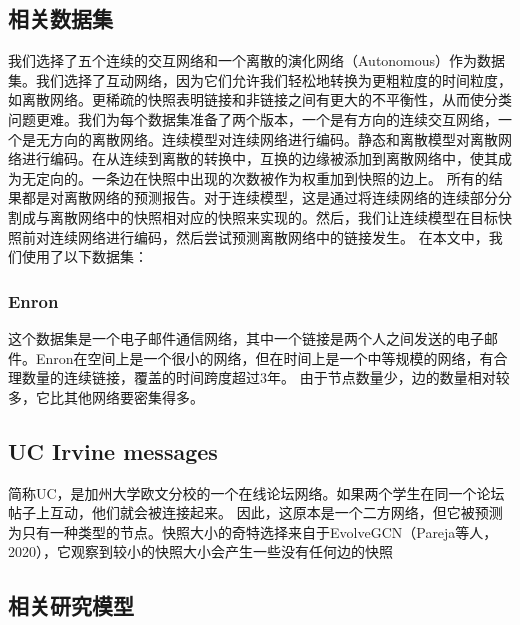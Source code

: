 \documentclass[conference]{IEEEtran}
\begin{document}
\subsection{相关数据集}
我们选择了五个连续的交互网络和一个离散的演化网络（Autonomous）作为数据集。我们选择了互动网络，因为它们允许我们轻松地转换为更粗粒度的时间粒度，如离散网络。更稀疏的快照表明链接和非链接之间有更大的不平衡性，从而使分类问题更难。我们为每个数据集准备了两个版本，一个是有方向的连续交互网络，一个是无方向的离散网络。连续模型对连续网络进行编码。静态和离散模型对离散网络进行编码。在从连续到离散的转换中，互换的边缘被添加到离散网络中，使其成为无定向的。一条边在快照中出现的次数被作为权重加到快照的边上。
所有的结果都是对离散网络的预测报告。对于连续模型，这是通过将连续网络的连续部分分割成与离散网络中的快照相对应的快照来实现的。然后，我们让连续模型在目标快照前对连续网络进行编码，然后尝试预测离散网络中的链接发生。
在本文中，我们使用了以下数据集：

\subsubsection{Enron}
这个数据集是一个电子邮件通信网络，其中一个链接是两个人之间发送的电子邮件。Enron在空间上是一个很小的网络，但在时间上是一个中等规模的网络，有合理数量的连续链接，覆盖的时间跨度超过3年。
由于节点数量少，边的数量相对较多，它比其他网络要密集得多。

\subsection{UC Irvine messages}
简称UC，是加州大学欧文分校的一个在线论坛网络。如果两个学生在同一个论坛帖子上互动，他们就会被连接起来。
因此，这原本是一个二方网络，但它被预测为只有一种类型的节点。快照大小的奇特选择来自于EvolveGCN（Pareja等人，2020），它观察到较小的快照大小会产生一些没有任何边的快照

\subsection{相关研究模型}


 

% 
\end{document}
